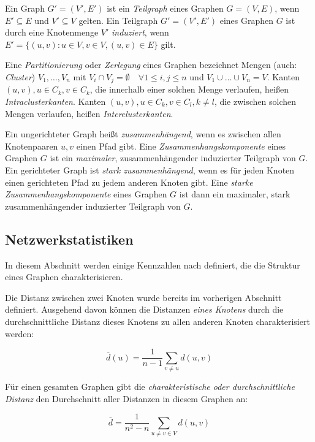Ein Graph $G' = (V', E')$ ist ein \emph{Teilgraph} eines Graphen $G =
(V, E)$, wenn $E' \subseteq E$ und $V' \subseteq V$ gelten. Ein
Teilgraph $G' = (V', E')$ eines Graphen $G$ ist durch eine
Knotenmenge $V'$ \emph{induziert}, wenn $E' = \{(u, v) : u \in V, v
\in V, (u, v) \in E\}$ gilt.

Eine \emph{Partitionierung} oder \emph{Zerlegung} eines Graphen
bezeichnet Mengen (auch: \emph{Cluster}) $V_1, \dots, V_n$ mit $V_i
\cap V_j = \emptyset \quad \forall 1 \le i, j \le n$ und $V_1 \cup
\dots \cup V_n = V$. Kanten $(u, v), u \in C_k, v \in C_k$, die
innerhalb einer solchen Menge verlaufen, heißen
\emph{Intraclusterkanten}. Kanten $(u, v), u \in C_k, v \in C_l, k \ne
l$, die zwischen solchen Mengen verlaufen, heißen
\emph{Interclusterkanten}.

Ein ungerichteter Graph heißt \emph{zusammenhängend}, wenn es
zwischen allen Knotenpaaren $u, v$ einen Pfad gibt. Eine
\emph{Zusammenhangskomponente} eines Graphen $G$ ist ein
\emph{maximaler}, zusammenhängender induzierter Teilgraph von
$G$. Ein gerichteter Graph ist \emph{stark zusammenhängend}, wenn es
für jeden Knoten einen gerichteten Pfad zu jedem anderen Knoten gibt. Eine
\emph{starke Zusammenhangskomponente} eines Graphen $G$ ist dann ein
maximaler, stark zusammenhängender induzierter Teilgraph von $G$.

\subsection{Netzwerkstatistiken}
\label{ch:Grundlagen:sec:Netzwerkanalyse:subsec:Statistiken}

In diesem Abschnitt werden einige Kennzahlen nach
\cite{Brinkmeier2004} definiert, die die Struktur eines Graphen
charakterisieren.

Die Distanz zwischen zwei Knoten wurde bereits im vorherigen Abschnitt
definiert. Ausgehend davon können die Distanzen \emph{eines Knotens}
durch die durchschnittliche Distanz dieses Knotens zu allen anderen
Knoten charakterisiert werden:

\begin{equation}
  \label{eq:1}
  \bar{d}(u) = \frac{1}{n-1} \sum_{v \ne u} d(u, v)
\end{equation}

Für einen gesamten Graphen gibt die \emph{charakteristische oder
  durchschnittliche Distanz} den Durchschnitt aller Distanzen in
diesem Graphen an:

\begin{equation}
  \label{eq:2}
  \bar{d} = \frac{1}{n^2 - n} \sum_{u \ne v \in V} d(u, v)
\end{equation}

